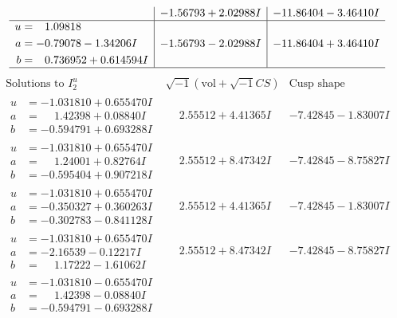 \documentclass[1p]{elsarticle_modified}
\theoremstyle{definition}
\newcommand{\I}{\sqrt{-1}}
\begin{document}
$$\begin{array}{c|c|c}
 & -1.56793 + 2.02988 I & -11.86404 - 3.46410 I \\ \hline\begin{aligned}
u &= \phantom{-}1.09818\phantom{ +0.000000I} \\
a &= -0.79078 - 1.34206 I \\
b &= \phantom{-}0.736952 + 0.614594 I\end{aligned}
 & -1.56793 - 2.02988 I & -11.86404 + 3.46410 I\\
 \hline 
 \end{array}$$\newpage$$\begin{array}{c|c|c}  
\text{Solutions to }I^u_{2}& \I (\text{vol} + \sqrt{-1}CS) & \text{Cusp shape}\\
 \hline 
\begin{aligned}
u &= -1.031810 + 0.655470 I \\
a &= \phantom{-}1.42398 + 0.08840 I \\
b &= -0.594791 + 0.693288 I\end{aligned}
 & \phantom{-}2.55512 + 4.41365 I & -7.42845 - 1.83007 I \\ \hline\begin{aligned}
u &= -1.031810 + 0.655470 I \\
a &= \phantom{-}1.24001 + 0.82764 I \\
b &= -0.595404 + 0.907218 I\end{aligned}
 & \phantom{-}2.55512 + 8.47342 I & -7.42845 - 8.75827 I \\ \hline\begin{aligned}
u &= -1.031810 + 0.655470 I \\
a &= -0.350327 + 0.360263 I \\
b &= -0.302783 - 0.841128 I\end{aligned}
 & \phantom{-}2.55512 + 4.41365 I & -7.42845 - 1.83007 I \\ \hline\begin{aligned}
u &= -1.031810 + 0.655470 I \\
a &= -2.16539 - 0.12217 I \\
b &= \phantom{-}1.17222 - 1.61062 I\end{aligned}
 & \phantom{-}2.55512 + 8.47342 I & -7.42845 - 8.75827 I \\ \hline\begin{aligned}
u &= -1.031810 - 0.655470 I \\
a &= \phantom{-}1.42398 - 0.08840 I \\
b &= -0.594791 - 0.693288 I\end{aligned}

\end{array}$$
\end{document}
